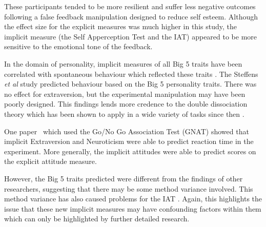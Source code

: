 These participants tended to be more resilient and suffer less negative outcomes following a false feedback manipulation designed to reduce self esteem. Although the effect size for the explicit measures was much higher in this study, the implicit measure (the Self Apperception Test and the IAT) appeared to be more sensitive to the emotional tone of the feedback. 


In the domain of personality, implicit measures of all Big 5 traits have been correlated with spontaneous behaviour which reflected these traits \cite{Steffens2006}. 
The Steffens \textit{et al} study predicted behaviour based on the Big 5 personality traits. There was no effect for extraversion, but the experimental manipulation may have been poorly designed. This findings lends more credence to the double dissociation theory \cite{Asendorpf2002} which has been shown to apply in a wide variety of tasks since then \cite{Perugini2005,Conner2005}. 



One paper~\cite{Boldero2007} which used the Go/No Go Association Test (GNAT) showed that implicit Extraversion and Neuroticism were able to predict reaction time in the experiment. More generally, the implicit attitudes were able to predict scores on the explicit attitude measure. 

However, the Big 5 traits predicted were different from the findings of other researchers, suggesting that there may be some method variance involved. This method variance has also caused problems for the IAT \cite{Mierke2003,Greenwald2003a}. Again, this highlights the issue that these new implicit measures may have confounding factors within them which can only be highlighted by further detailed research.

